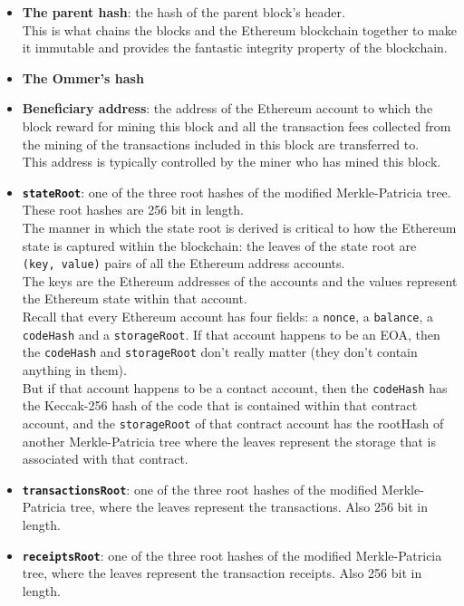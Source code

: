\begin{itemize}
\item
  \textbf{The parent hash}: the hash of the parent block's header.\\

  This is what chains the blocks and the Ethereum blockchain together to
  make it immutable and provides the fantastic integrity property of the
  blockchain.
\item
  \textbf{The Ommer's hash}
\item
  \textbf{Beneficiary address}: the address of the Ethereum account to
  which the block reward for mining this block and all the transaction
  fees collected from the mining of the transactions included in this
  block are transferred to.\\

  This address is typically controlled by the miner who has mined this
  block.
\item
  \textbf{\texttt{stateRoot}}: one of the three root hashes of the
  modified Merkle-Patricia tree. These root hashes are 256 bit in
  length.\\

  The manner in which the state root is derived is critical to how the
  Ethereum state is captured within the blockchain: the leaves of the
  state root are \texttt{(key,\ value)} pairs of all the Ethereum
  address accounts.\\

  The keys are the Ethereum addresses of the accounts and the values
  represent the Ethereum state within that account.\\

  Recall that every Ethereum account has four fields: a \texttt{nonce},
  a \texttt{balance}, a \texttt{codeHash} and a \texttt{storageRoot}. If
  that account happens to be an EOA, then the \texttt{codeHash} and
  \texttt{storageRoot} don't really matter (they don't contain anything
  in them).\\

  But if that account happens to be a contact account, then the
  \texttt{codeHash} has the Keccak-256 hash of the code that is
  contained within that contract account, and the \texttt{storageRoot}
  of that contract account has the rootHash of another Merkle-Patricia
  tree where the leaves represent the storage that is associated with
  that contract.
\item
  \textbf{\texttt{transactionsRoot}}: one of the three root hashes of
  the modified Merkle-Patricia tree, where the leaves represent the
  transactions. Also 256 bit in length.
\item
  \textbf{\texttt{receiptsRoot}}: one of the three root hashes of the
  modified Merkle-Patricia tree, where the leaves represent the
  transaction receipts. Also 256 bit in length.\\


\end{itemize}
